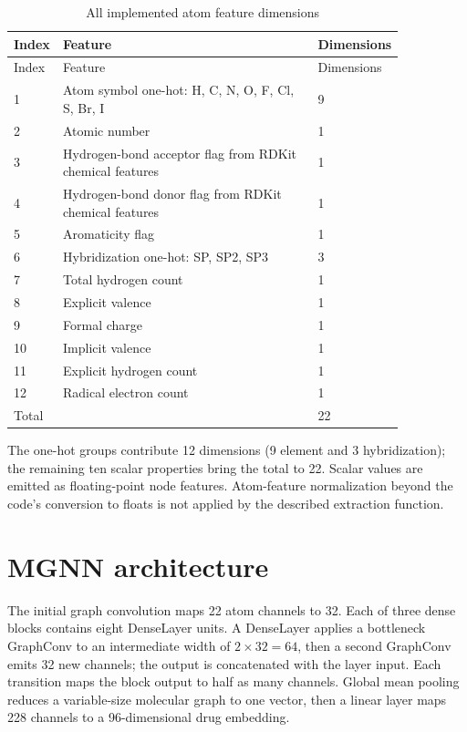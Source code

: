 \begin{longtable}{p{0.08\linewidth}p{0.65\linewidth}p{0.12\linewidth}}\caption{All implemented atom feature dimensions}\label{tab:atomfeatures}\\\toprule Index & Feature & Dimensions\\\midrule\endfirsthead\toprule Index & Feature & Dimensions\\\midrule\endhead
1 & Atom symbol one-hot: H, C, N, O, F, Cl, S, Br, I & 9\\
2 & Atomic number & 1\\3 & Hydrogen-bond acceptor flag from RDKit chemical features & 1\\4 & Hydrogen-bond donor flag from RDKit chemical features & 1\\5 & Aromaticity flag & 1\\6 & Hybridization one-hot: SP, SP2, SP3 & 3\\7 & Total hydrogen count & 1\\8 & Explicit valence & 1\\9 & Formal charge & 1\\10 & Implicit valence & 1\\11 & Explicit hydrogen count & 1\\12 & Radical electron count & 1\\\midrule Total & & 22\\\bottomrule\end{longtable}

The one-hot groups contribute 12 dimensions (9 element and 3 hybridization); the remaining ten scalar properties bring the total to 22. Scalar values are emitted as floating-point node features. Atom-feature normalization beyond the code's conversion to floats is not applied by the described extraction function.

\section{MGNN architecture}
The initial graph convolution maps 22 atom channels to 32. Each of three dense blocks contains eight DenseLayer units. A DenseLayer applies a bottleneck GraphConv to an intermediate width of $2\times32=64$, then a second GraphConv emits 32 new channels; the output is concatenated with the layer input. Each transition maps the block output to half as many channels. Global mean pooling reduces a variable-size molecular graph to one vector, then a linear layer maps 228 channels to a 96-dimensional drug embedding.

